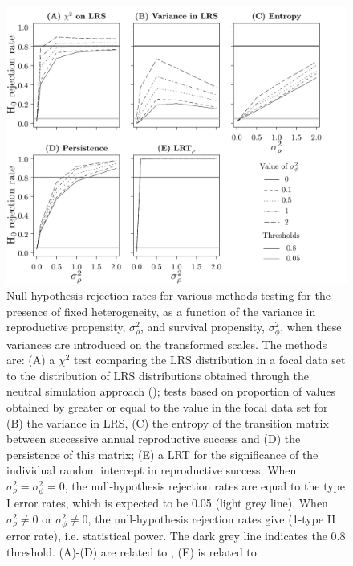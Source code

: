\begin{figure}[ht]
	\includegraphics[width=\textwidth]{FiguresDynHet/Figure2}
		\caption{ \footnotesize Null-hypothesis rejection rates for various methods testing for the presence of fixed heterogeneity, as a function of the variance in reproductive propensity, $\sigma_{\rho}^2$, and survival propensity, $\sigma_{\phi}^2$, when these variances are introduced on the transformed scales. The methods are: (A) a $\chi^2$ test comparing the LRS distribution in a focal data set to the distribution of LRS distributions obtained through the neutral simulation approach (\NSM); tests based on proportion of values obtained by \NSM greater or equal to the value in the focal data set for (B) the variance in LRS, (C) the entropy of the transition matrix between successive annual reproductive success and (D) the persistence of this matrix; (E) a LRT for the significance of the individual random intercept in reproductive success. When $\sigma_{\rho}^2 = \sigma_{\phi}^2 = 0$, the null-hypothesis rejection rates are equal to the type I error rates, which is expected to be 0.05 (light grey line). When $\sigma_{\rho}^2 \neq 0$ or $\sigma_{\phi}^2 \neq 0$, the null-hypothesis rejection rates give (1-type II error rate), i.e. statistical power. The dark grey line indicates the 0.8 threshold. (A)-(D) are related to \NSM, (E) is related to \MM.}
	\label{figure:VarIn}
\end{figure} 	 

